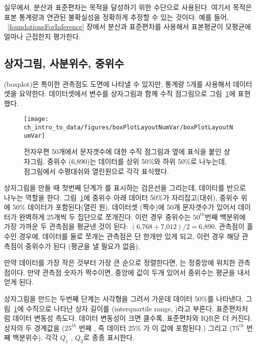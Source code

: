 실무에서, 분산과 표준편차는 목적을 달성하기 위한 수단으로 사용된다. 
여기서 목적은 표본 통계량과 연관된 불확실성을 정확하게 추정할 수 있는 것이다.
예를 들어, ~\ref{foundationsForInference} 장에서 분산과 표준편차를 사용해서 표본평균이 모평균에 얼마나 근접한지 평가한다.

\subsection{상자그림, 사분위수, 중위수}

(boxplot)은 특이한 관측점도 도면에 나타낼 수 있지만, 통계량 5개를 사용해서 데이터셋을 요약한다.
 데이터셋에서  변수를 상자그림과 함께 수직 점그림으로 그림~\ref{boxPlotLayoutNumVar}에 표현했다.

\begin{figure}[h]
   \centering
   \texttt{[image: ch\_intro\_to\_data/figures/boxPlotLayoutNumVar/boxPlotLayoutNumVar]}
   \caption{전자우편 50개에서 문자갯수에 대한 수직 점그림과 옆에 표식을 붙인 상자그림.
   중위수 (6,890)는 데이터를 상위  50\%와 하위 50\%로 나누는데, 점그림에서 수평대쉬와 열린원으로 각각 표식했다.}
   \label{boxPlotLayoutNumVar}
\end{figure}

상자그림을 만들 때 첫번째 단계가 를 표시하는 검은선을 그리는데, 데이터를 반으로 나누는 역할을 한다.
그림~\ref{boxPlotLayoutNumVar}에 중위수 아래 데이터 50\%가 자리잡고(대쉬), 중위수 위에 50\% 데이터가 포함된다(열린 원).
데이터셋 (짝수)에 50개 문자갯수가 있어서 데이터가 완벽하게 25개씩 두 집단으로 쪼개진다.
이런 경우 중위수는  $50^{th}$번째 백분위에 가장 가까운 두 관측점을 평균낸 것이 된다: $(\text{6,768} + \text{7,012}) / 2 = \text{6,890}$.
관측점이 홀수인 경우에, 데이터를 둘로 쪼개는 관측점은 단 한개만 있게 되고, 이런 경우 해당 관측점이 중위수가 된다 (평균을 낼 필요가 없음).

\begin{termBox}{
만약 데이터를 가장 작은 것부터 가장 큰 순으로 정렬한다면, 는 정중앙에 위치한 관측점이다.
만약 관측점 숫자가 짝수이면, 중앙에 값이 두개 있어서 중위수는 평균을 내서 얻게 된다.}
\end{termBox}

상자그림을 만드는 두번째 단계는 사각형을 그려서 가운데 데이터 50\%를 나타낸다.
그림~\ref{boxPlotLayoutNumVar}에 수직으로 나타난 상자 길이를 
 (interquartile range, )라고 부른다.
표준편차처럼 데이터 변동성 측도다. 데이터 변동성이 크면 클수록, 표준편차와 IQR은 더 커진다.
상자의 두 경계값을   ($25^{th}$ 번째 , 즉 
데이터 25\% 가 이 값에 포함된다.) 그리고   ($75^{th}$ 번째 백분위수).
각각 $Q_1$ , $Q_3$로 종종 표시한다.

